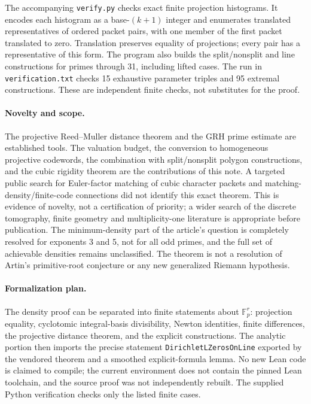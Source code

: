 \documentclass[11pt]{article}
\theoremstyle{definition}\newtheorem{definition}[theorem]{Definition}
\theoremstyle{remark}\newtheorem{remark}[theorem]{Remark}
\newcommand{\F}{\mathbb F}
\begin{document}
The accompanying \texttt{verify.py} checks exact finite projection histograms. It encodes each histogram as a base-$(k+1)$ integer and enumerates translated representatives of ordered packet pairs, with one member of the first packet translated to zero. Translation preserves equality of projections; every pair has a representative of this form. The program also builds the split/nonsplit and line constructions for primes through 31, including lifted cases. The run in \texttt{verification.txt} checks 15 exhaustive parameter triples and 95 extremal constructions. These are independent finite checks, not substitutes for the proof.

\paragraph{Novelty and scope.} The projective Reed--Muller distance theorem and the GRH prime estimate are established tools. The valuation budget, the conversion to homogeneous projective codewords, the combination with split/nonsplit polygon constructions, and the cubic rigidity theorem are the contributions of this note. A targeted public search for Euler-factor matching of cubic character packets and matching-density/finite-code connections did not identify this exact theorem. This is evidence of novelty, not a certification of priority; a wider search of the discrete tomography, finite geometry and multiplicity-one literature is appropriate before publication. The minimum-density part of the article's question is completely resolved for exponents 3 and 5, not for all odd primes, and the full set of achievable densities remains unclassified. The theorem is not a resolution of Artin's primitive-root conjecture or any new generalized Riemann hypothesis.

\paragraph{Formalization plan.} The density proof can be separated into finite statements about $\F_p^r$: projection equality, cyclotomic integral-basis divisibility, Newton identities, finite differences, the projective distance theorem, and the explicit constructions. The analytic portion then imports the precise statement \texttt{DirichletLZerosOnLine} exported by the vendored theorem and a smoothed explicit-formula lemma. No new Lean code is claimed to compile; the current environment does not contain the pinned Lean toolchain, and the source proof was not independently rebuilt. The supplied Python verification checks only the listed finite cases.
\end{document}
